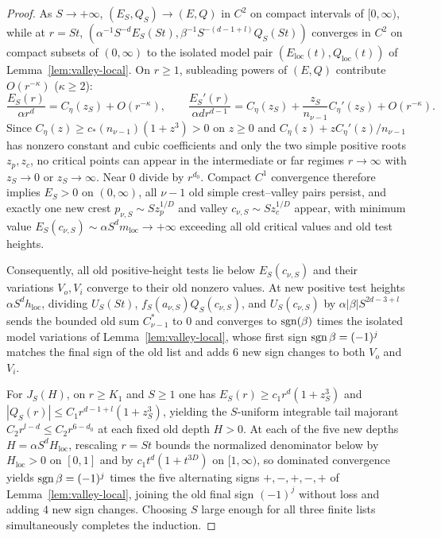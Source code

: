 \begin{proof}
As $S\to+\infty$, $(E_S,Q_S)\to(E,Q)$ in $C^2$ on compact intervals of $[0,\infty)$, while at $r=St$,
$(\alpha^{-1}S^{-d}E_S(St),\beta^{-1}S^{-(d-1+l)}Q_S(St))$ converges in $C^2$ on compact subsets of
$(0,\infty)$ to the isolated model pair $(E_{\mathrm{loc}}(t),Q_{\mathrm{loc}}(t))$ of
Lemma~\ref{lem:valley-local}. On $r\ge 1$, subleading powers of $(E,Q)$ contribute $O(r^{-\kappa})$
($\kappa\ge 2$):
\[
  \frac{E_S(r)}{\alpha r^d} = C_\eta(z_S) + O(r^{-\kappa}), \qquad \frac{E_S'(r)}{\alpha d r^{d-1}} =
  C_\eta(z_S) + \frac{z_S}{n_{\nu-1}}C_\eta'(z_S) + O(r^{-\kappa}).
\]
Since $C_\eta(z)\ge c_*(n_{\nu-1})(1+z^3)>0$ on $z\ge 0$ and $C_\eta(z)+zC_\eta'(z)/n_{\nu-1}$ has nonzero
constant and cubic coefficients and only the two simple positive roots $z_p,z_c$, no critical points
can appear in the intermediate or far regimes $r\to\infty$ with $z_S\to 0$ or $z_S\to\infty$. Near $0$
divide by $r^{d_0}$. Compact $C^1$ convergence therefore implies $E_S>0$ on $(0,\infty)$, all $\nu-1$
old simple crest--valley pairs persist, and exactly one new crest $p_{\nu,S}\sim S z_p^{1/D}$ and
valley $c_{\nu,S}\sim S z_c^{1/D}$ appear, with minimum value $E_S(c_{\nu,S})\sim \alpha S^d
m_{\mathrm{loc}}\to+\infty$ exceeding all old critical values and old test heights.

Consequently, all old positive-height tests lie below $E_S(c_{\nu,S})$ and their variations $V_o,V_i$
converge to their old nonzero values. At new positive test heights $\alpha S^d h_{\mathrm{loc}}$,
dividing $U_S(St)$, $f_S(a_{\nu,S})Q_S(c_{\nu,S})$, and $U_S(c_{\nu,S})$ by $\alpha|\beta| S^{2d-3+l}$
sends the bounded old sum $C_{\nu-1}^*$ to $0$ and converges to $\operatorname{sgn}(\beta)$ times the isolated model
variations of Lemma~\ref{lem:valley-local}, whose first sign $\operatorname{sgn}\beta=(-1)^j$ matches the final sign
of the old list and adds $6$ new sign changes to both $V_o$ and $V_i$.

For $J_S(H)$, on $r\ge K_1$ and $S\ge 1$ one has $E_S(r)\ge c_1 r^d(1+z_S^3)$ and $|Q_S(r)|\le C_1
r^{d-1+l}(1+z_S^3)$, yielding the $S$-uniform integrable tail majorant $C_2 r^{l-d}\le C_2 r^{6-d_0}$
at each fixed old depth $H>0$. At each of the five new depths $H=\alpha S^d H_{\mathrm{loc}}$,
rescaling $r=St$ bounds the normalized denominator below by $H_{\mathrm{loc}}>0$ on $[0,1]$ and by
$c_1 t^d(1+t^{3D})$ on $[1,\infty)$, so dominated convergence yields $\operatorname{sgn}\beta=(-1)^j$ times the five
alternating signs $+,-,+,-,+$ of Lemma~\ref{lem:valley-local}, joining the old final sign $(-1)^j$
without loss and adding $4$ new sign changes. Choosing $S$ large enough for all three finite lists
simultaneously completes the induction.
\end{proof}
